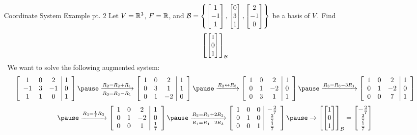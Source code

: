\documentclass[xcoler=dvipsnames, aspectratio=169]{beamer}
\newcommand{\B}{\mathcal{B}}
\begin{document}
    \begin{frame}{Coordinate System Example pt. 2}
        \footnotesize
        Let $V=\mathbb{R}^3$, $F=\mathbb{R}$, and $\B=\setBasic{\bMat{1\\-1\\1}, \bMat{0\\3\\1}, \bMat{2\\-1\\0}}$
        be a basis of $V$.\pause\ Find
        \[
            \bCoord{\bMat{1\\0\\1}}{\B}
        \]\pause\
        We want to solve the following augmented system:\pause\
        \[
            \aMat{ccc|c}{
                1 & 0 & 2 & 1\\
                -1& 3 &-1 & 0\\
                1 & 1 & 0 & 1
            }\pause\xrightarrow[R_3=R_3-R_1]{R_2=R_2+R_1}\aMat{ccc|c}{
                1 & 0 & 2 & 1\\
                0 & 3 & 1 & 1\\
                0 & 1 &-2 & 0
            }\pause\xrightarrow{R_2\leftrightarrow R_3}\aMat{ccc|c}{
                1 & 0 & 2 & 1\\
                0 & 1 &-2 & 0\\
                0 & 3 & 1 & 1
            }\pause\xrightarrow{R_3=R_3-3R_1}\aMat{ccc|c}{
                1 & 0 & 2 & 1\\
                0 & 1 &-2 & 0\\
                0 & 0 & 7 & 1
            }
        \]
        \[
            \pause\xrightarrow{R_3=\frac{1}{7}R_3}\aMat{ccc|c}{
                1 & 0 & 2 & 1\\
                0 & 1 &-2 & 0\\
                0 & 0 & 1 & \frac{1}{7}
            }\pause\xrightarrow[R_1=R_1-2R_3]{R_2=R_2+2R_3}\aMat{ccc|c}{
                1 & 0 & 0 & -\frac{2}{7}\\
                0 & 1 & 0 & \frac{2}{7}\\
                0 & 0 & 1 & \frac{1}{7}
            }\pause\rightarrow 
            \bCoord{\bMat{1\\0\\1}}{\B} = \bMat{-\frac{2}{7}\\\frac{2}{7}\\\frac{1}{7}}
        \]
    \end{frame}
\end{document}
